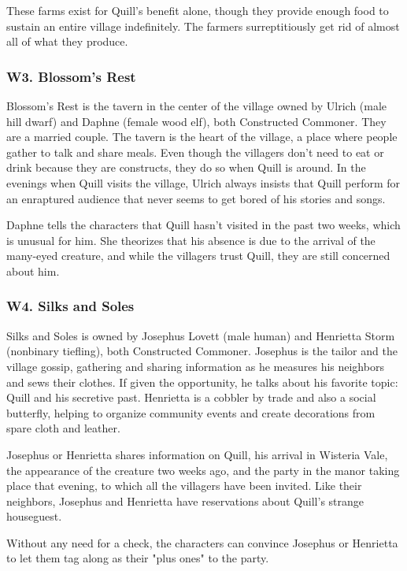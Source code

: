\documentclass[10pt,a4paper,twoside,bg=print,twocolumn,openany,nodeprecatedcode]{dndbook}
\begin{document}
These farms exist for Quill's benefit alone, though they provide enough food to sustain an entire village indefinitely. The farmers surreptitiously get rid of almost all of what they produce.

\subsubsection{W3. Blossom's Rest}
Blossom's Rest is the tavern in the center of the village owned by Ulrich (male hill dwarf) and Daphne (female wood elf), both Constructed Commoner. They are a married couple. The tavern is the heart of the village, a place where people gather to talk and share meals. Even though the villagers don't need to eat or drink because they are constructs, they do so when Quill is around. In the evenings when Quill visits the village, Ulrich always insists that Quill perform for an enraptured audience that never seems to get bored of his stories and songs.

Daphne tells the characters that Quill hasn't visited in the past two weeks, which is unusual for him. She theorizes that his absence is due to the arrival of the many-eyed creature, and while the villagers trust Quill, they are still concerned about him.

\subsubsection{W4. Silks and Soles}
Silks and Soles is owned by Josephus Lovett (male human) and Henrietta Storm (nonbinary tiefling), both Constructed Commoner. Josephus is the tailor and the village gossip, gathering and sharing information as he measures his neighbors and sews their clothes. If given the opportunity, he talks about his favorite topic: Quill and his secretive past. Henrietta is a cobbler by trade and also a social butterfly, helping to organize community events and create decorations from spare cloth and leather.

Josephus or Henrietta shares information on Quill, his arrival in Wisteria Vale, the appearance of the creature two weeks ago, and the party in the manor taking place that evening, to which all the villagers have been invited. Like their neighbors, Josephus and Henrietta have reservations about Quill's strange houseguest.

Without any need for a check, the characters can convince Josephus or Henrietta to let them tag along as their "plus ones" to the party.
\end{document}
